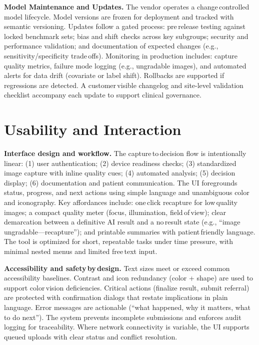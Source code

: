 \documentclass[sigplan,screen]{acmart}
\begin{document}
\textbf{Model Maintenance and Updates.} The vendor operates a change\,controlled model lifecycle. Model versions are frozen for deployment and tracked with semantic versioning. Updates follow a gated process: pre\,release testing against locked benchmark sets; bias and shift checks across key subgroups; security and performance validation; and documentation of expected changes (e.g., sensitivity/specificity trade\,offs). Monitoring in production includes: capture\,quality metrics, failure mode logging (e.g., ungradable images), and automated alerts for data drift (covariate or label shift). Rollbacks are supported if regressions are detected. A customer\,visible changelog and site-level validation checklist accompany each update to support clinical governance\cite{fda2025aiml}.

\section{Usability and Interaction}
\textbf{Interface design and workflow.} The capture\,to\,decision flow is intentionally linear: (1) user authentication; (2) device readiness checks; (3) standardized image capture with inline quality cues; (4) automated analysis; (5) decision display; (6) documentation and patient communication. The UI foregrounds status, progress, and next actions using simple language and unambiguous color and iconography. Key affordances include: one\,click recapture for low\,quality images; a compact quality meter (focus, illumination, field\,of\,view); clear demarcation between a definitive AI result and a no\,result state (e.g., “image ungradable—recapture”); and printable summaries with patient\,friendly language. The tool is optimized for short, repeatable tasks under time pressure, with minimal nested menus and limited free\,text input\cite{nielsen2020usability}.

\textbf{Accessibility and safety\,by\,design.} Text sizes meet or exceed common accessibility baselines. Contrast and icon redundancy (color + shape) are used to support color\,vision deficiencies. Critical actions (finalize result, submit referral) are protected with confirmation dialogs that restate implications in plain language. Error messages are actionable (“what happened, why it matters, what to do next”). The system prevents incomplete submissions and enforces audit logging for traceability. Where network connectivity is variable, the UI supports queued uploads with clear status and conflict resolution.
\end{document}
